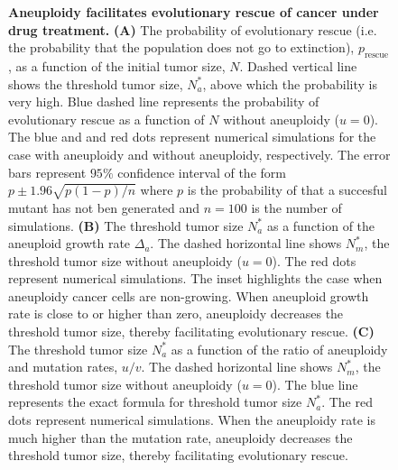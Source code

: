 \documentclass[12pt]{extarticle}
\newcommand{\presc}{p_\text{rescue}}
\begin{document}
\begin{figure}
\begin{subfigure}{0.5\textwidth}
\end{subfigure}
\caption{
\textbf{Aneuploidy facilitates evolutionary rescue of cancer under drug treatment.}
\textbf{(A)} The probability of evolutionary rescue (i.e. the probability that the population does not go to extinction), $\presc$, as a function of the initial tumor size, $N$. Dashed vertical line shows the threshold tumor size, $N_a^*$, above which the probability is very high. Blue dashed line represents the probability of evolutionary rescue as a function of $N$ without aneuploidy ($u=0$). The blue and and red dots represent numerical simulations for the case with aneuploidy and without aneuploidy, respectively. The error bars represent $95\%$ confidence interval of the form $p\pm1.96\sqrt{p\left(1-p\right)/n}$ where $p$ is the  probability of that a succesful mutant has not ben generated and $n=100$ is the number of simulations.
\textbf{(B)} The threshold tumor size $N_a^*$ as a function of the aneuploid growth rate $\Delta_a$. The dashed horizontal line shows $N^*_m$, the threshold tumor size without aneuploidy ($u=0$). The red dots represent numerical simulations.  The inset highlights the case when aneuploidy cancer cells are non-growing. When aneuploid growth rate is close to or higher than zero, aneuploidy decreases the threshold tumor size, thereby facilitating evolutionary rescue. 
\textbf{(C)} The threshold tumor size $N_a^*$ as a function of the ratio of aneuploidy and mutation rates, $u/v$. The dashed horizontal line shows $N^*_m$, the threshold tumor size without aneuploidy ($u=0$). The blue line represents the exact formula for threshold tumor size $N_a^*$. The red dots represent numerical simulations.  When the aneuploidy rate is much higher than the mutation rate, aneuploidy decreases the threshold tumor size, thereby facilitating evolutionary rescue.
}
\label{rescue_prob}
\end{figure}
\end{document}
